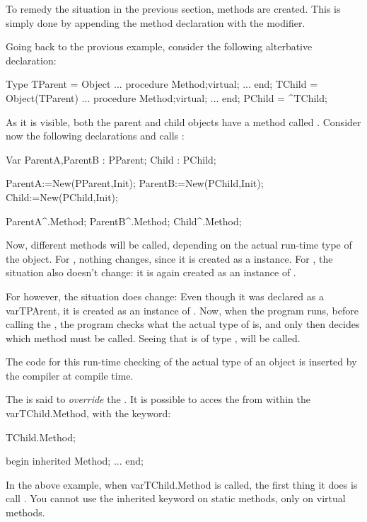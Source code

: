 \documentclass{report}
\begin{document}
To remedy the situation in the previous section,  methods are
created. This is simply done by appending the method declaration with the
 modifier.

Going back to the provious example, consider the following alterbative
declaration:
\begin{listing}
Type
  TParent = Object 
    ...
    procedure Method;virtual;
    ...
    end;
  TChild = Object(TParent) 
    ...
    procedure Method;virtual;
    ...
    end;
  PChild = ^TChild;  
\end{listing}
As it is visible, both the parent and child objects have a method called
. Consider now the following declarations and calls :
\begin{listing}
Var ParentA,ParentB : PParent;
    Child           : PChild;

   ParentA:=New(PParent,Init);
   ParentB:=New(PChild,Init);
   Child:=New(PChild,Init);

   ParentA^.Method;
   ParentB^.Method;
   Child^.Method;
\end{listing}
Now, different methods will be called, depending on the actual run-time type
of the object. For , nothing changes, since it is created as
a  instance. For , the situation also doesn't
change: it is again created as an instance of .

For  however, the situation does change: Even though it was
declared as a var{TPArent}, it is created as an instance of .
Now, when the program runs, before calling the , the program
checks what the actual type of  is, and only then decides which
method must be called. Seeing that  is of type ,
 will be called.

The code for this run-time checking of the actual type of an object is
inserted by the compiler at compile time.

The  is said to {\em override} the .
It is possible to acces the  from within the
var{TChild.Method}, with the  keyword:
\begin{listing}
TChild.Method;

begin
  inherited Method; 
  ...
end;
\end{listing}
In the above example, when var{TChild.Method} is called, the first thing it
does is call . You cannot use the inherited keyword on 
static methods, only on virtual methods.
\end{document}
